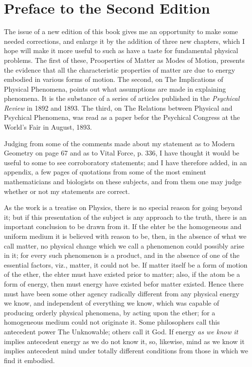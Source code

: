 \documentclass[oneside,12pt]{book}
\begin{document}
\chapter{Preface to the Second Edition}
The issue of a new edition of this book gives me an opportunity to make some needed corrections, and enlarge it by the addition of three new chapters,
which I hope will make it more useful to such as have a taste for fundamental physical problems. The first of these, Prooperties of Matter as Modes of Motion,
presents the evidence that all the characteristic properties of matter are due to energy embodied in various forms of motion. The second, on The 
Implications of Physical Phenomena, points out what assumptions are made in explaining phenomena. It is the substance of a series of articles published in the 
\textit{Psychical Review} in 1892 and 1893. The third, on The Relations between Physical and Psychical Phenomena, was read as a paper befor the Psychical Congress
at the World's Fair in August, 1893. \par 

Judging from some of the comments made about my statement as to Modern Geometry on page 67 %
and as to Vital Force, p. 336, %
I have thought it would be useful to some to see corroboratory statements; and I have therefore added, in an appendix, a few pages of quotations from some 
of the most eminent mathematicians and biologists on these subjects, and from them one may judge whether or not my statements are correct. \par 

As the work is a treatise on Physics, there is no special reason for going beyond it; but if this presentation of the subject is any approach to the truth,
there is an important conclusion to be drawn from it. If the ehter be the homogeneous and uniform medium it is believed with reason to be, then, in the absence
of what we call matter, no physical change which we call a phenomenon could possibly arise in it; for every such phenomenon is a product, and in the absence of
one of the essential factors, viz., matter, it could not be. If matter itself be a form of motion of the ether, the ehter must have existed prior to matter; also,
if the atom be a form of energy, then must energy have existed befor matter existed. Hence there must have been some other agency radically different from any physical 
energy we know, and independent of everything we know, which was capable of producing orderly physical phenomena, by acting upon the ether; for a homogeneous medium could not originate it. 
Some philosophers call this antecedent power The Unknowable; others call it God. If energy \textit{as we know it} implies antecedent energy as we do not know it,
so, likewise, mind as we know it implies antecedent mind under totally different conditions from those in which we find it embodied. \par 
\end{document}

